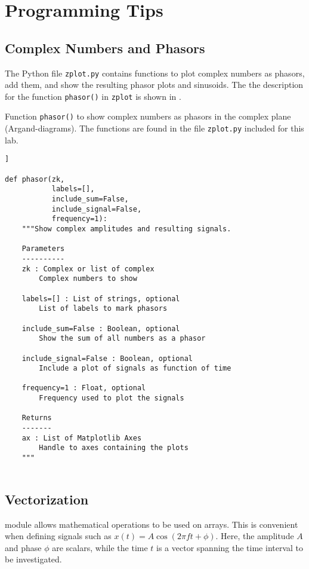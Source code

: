 \section{Programming Tips}

\subsection{Complex Numbers and Phasors}
The Python file \verb|zplot.py| contains functions to plot complex numbers as phasors, add them, and show the resulting phasor plots and sinusoids. 
The the description for the function \verb|phasor()| in  \verb|zplot|  is shown in .

\begin{table}[h!]
\caption{Function \texttt{phasor()} to show complex numbers as phasors in the complex plane (Argand-diagrams). The functions are found in the file \texttt{zplot.py} included for this lab. }
\label{tab:zplot}
\begin{lstlisting}[style=pythonstyle]]

def phasor(zk,
		   labels=[],
		   include_sum=False,
		   include_signal=False,
		   frequency=1):
	"""Show complex amplitudes and resulting signals.

	Parameters
	----------
	zk : Complex or list of complex
		Complex numbers to show
	
	labels=[] : List of strings, optional
		List of labels to mark phasors
	
	include_sum=False : Boolean, optional
		Show the sum of all numbers as a phasor
	
	include_signal=False : Boolean, optional
		Include a plot of signals as function of time
	
	frequency=1 : Float, optional
		Frequency used to plot the signals
	
	Returns
	-------
	ax : List of Matplotlib Axes
		Handle to axes containing the plots
	"""
	
\end{lstlisting}
\end{table}

\subsection{Vectorization}
\numpy module allows mathematical operations to be used on arrays. This is convenient when defining signals such as $x(t)=A \cos(2\pi f t + \phi)$. Here, the amplitude $A$ and phase $\phi$ are scalars, while the time $t$ is a vector spanning the time interval to be investigated. 

